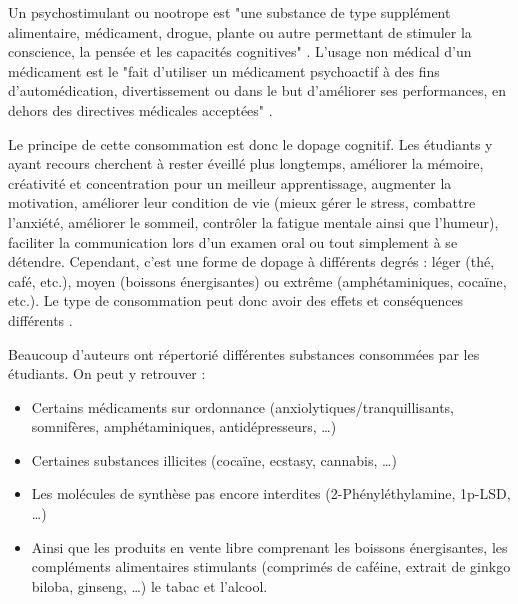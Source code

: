 Un psychostimulant ou nootrope est "une substance de type supplément alimentaire, médicament, drogue, plante ou autre permettant de stimuler la conscience, la pensée et les capacités cognitives" \parencite{noauthor_nootrope_nodate, suliman_establishing_2016}. \newline
L'usage non médical d'un médicament est le "fait d'utiliser un médicament psychoactif à des fins d'automédication, divertissement ou dans le but d'améliorer ses performances, en dehors des directives médicales acceptées" \parencite{european_monitoring_centre_for_drugs_and_drug_addiction_usage_2021}. \newline

Le principe de cette consommation est donc le dopage cognitif. Les étudiants y ayant recours cherchent à rester éveillé plus longtemps, améliorer la mémoire, créativité et concentration pour un meilleur apprentissage, augmenter la motivation, améliorer leur condition de vie (mieux gérer le stress, combattre l'anxiété, améliorer le sommeil, contrôler la fatigue mentale ainsi que l'humeur), faciliter la communication lors d'un examen oral ou tout simplement à se détendre. Cependant, c'est une forme de dopage à différents degrés : léger (thé, café, etc.), moyen (boissons énergisantes) ou extrême (amphétaminiques, cocaïne, etc.). Le type de consommation peut donc avoir des effets et conséquences différents \parencite{carton_dopage_2018}. \newline 



Beaucoup d'auteurs ont répertorié différentes substances consommées par les étudiants. 
On peut y retrouver : 

\begin{itemize}
\item
  Certains médicaments sur ordonnance (anxiolytiques/tranquillisants,
  somnifères, amphétaminiques, antidépresseurs, \ldots)
\item
  Certaines substances illicites (cocaïne, ecstasy, cannabis, \ldots)
\item
  Les molécules de synthèse pas encore interdites (2-Phényléthylamine,
  1p-LSD, \ldots)
\item
  Ainsi que les produits en vente libre comprenant les boissons
  énergisantes, les compléments alimentaires stimulants (comprimés de
  caféine, extrait de ginkgo biloba, ginseng, \ldots) le tabac et
  l'alcool\parencite{shakeel_concept_2021, suliman_establishing_2016}. \newline
\end{itemize}


